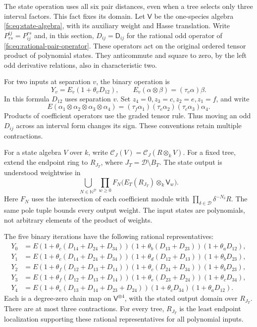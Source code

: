 The state operation uses all six pair distances, even when a tree
selects only three interval factors.  This fact fixes its domain.
Let \(\mathsf V\) be the one-species algebra
\eqref{fs:eq:state-algebra}, with its auxiliary weight and Hasse
translation.  Write \(P_{rs}^{ij}=P_{ij}^{rs}\) and, in this section,
\(D_{ij}=\mathsf D_{ij}\) for the rational odd operator of
\eqref{fs:eq:rational-pair-operator}.  These operators act on the
original ordered tensor product of polynomial states.  They anticommute
and square to zero, by the left odd derivative relations, also in
characteristic two.

For two inputs at separation \(v\), the binary operation is
\[
 Y_v=E_v(1+\theta_v D_{12}),\qquad
 E_v(\alpha\otimes\beta)=(\tau_v\alpha)\beta.
\]
In this formula \(D_{12}\) uses separation \(v\).
Set \(z_4=0,z_3=c,z_2=e,z_1=f\), and write
\[
 E(\alpha_1\otimes\alpha_2\otimes\alpha_3\otimes\alpha_4)
  =(\tau_f\alpha_1)(\tau_e\alpha_2)(\tau_c\alpha_3)\alpha_4.
\]
Products of coefficient operators use the graded tensor rule.
Thus moving an odd \(D_{ij}\) across an interval form changes
its sign.  These conventions retain multiple contractions.

For a state algebra \(V\) over \(k\), write
\(\mathcal C_J(V)=\mathcal C_J(R\otimes_kV)\).
For a fixed tree, extend the endpoint ring to \(R_{J_T}\),
where \(J_T=\mathcal D\setminus B_T\).  The state output is
understood weightwise in
\[
 \bigcup_{N\in\mathbb N^{\mathcal D}}
 \prod_{w\ge0}F_N\bigl(E_T(R_{J_T})\otimes_k\mathsf V_w\bigr).
\]
Here \(F_N\) uses the intersection of each coefficient module
with \(\prod_{\delta\in\mathcal D}\delta^{-N_\delta}R\).
The same pole tuple bounds every output weight.  The input states
are polynomials, not arbitrary elements of the product of weights.

\begin{proposition}
\label{fp:prop:four-state-formulas}
The five binary iterations have the following rational representatives:
\begin{equation}\label{fp:eq:four-state-formulas}
\begin{aligned}
 Y_0&=E(1+\theta_c(D_{14}+D_{24}+D_{34}))
         (1+\theta_b(D_{13}+D_{23}))(1+\theta_aD_{12}),\\
 Y_1&=E(1+\theta_c(D_{14}+D_{24}+D_{34}))
         (1+\theta_d(D_{12}+D_{13}))(1+\theta_bD_{23}),\\
 Y_2&=E(1+\theta_f(D_{12}+D_{13}+D_{14}))
         (1+\theta_c(D_{24}+D_{34}))(1+\theta_bD_{23}),\\
 Y_3&=E(1+\theta_f(D_{12}+D_{13}+D_{14}))
         (1+\theta_e(D_{23}+D_{24}))(1+\theta_cD_{34}),\\
 Y_4&=E(1+\theta_e(D_{13}+D_{14}+D_{23}+D_{24}))
         (1+\theta_cD_{34})(1+\theta_aD_{12}).
\end{aligned}
\end{equation}
Each is a degree-zero chain map on \(\mathsf V^{\otimes4}\),
with the stated output domain over \(R_{J_T}\).
There are at most three contractions.
For every tree, \(R_{J_T}\) is the least endpoint localization
supporting these rational representatives for all polynomial inputs.
\end{proposition}

